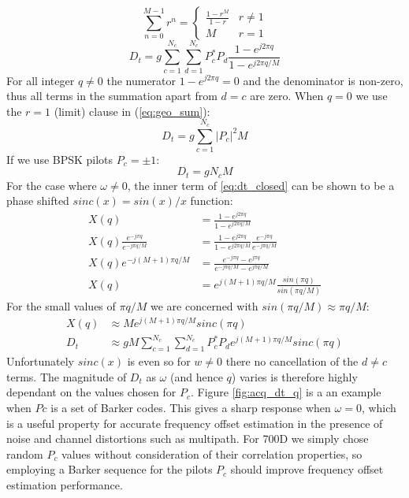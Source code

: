 \documentclass{article}
\begin{document}
\begin{equation}
\label{eq:geo_sum}
\sum_{n=0}^{M-1} r^n = 
\begin{cases}
  \frac{1-r^M}{1-r} & r \ne 1 \\
   M                & r = 1 
\end{cases}   
\end{equation}
\begin{equation}
\label{eq:dt_closed}
D_t = g \sum_{c=1}^{N_c} \sum_{d=1}^{N_c}P^*_c P_d \frac{1 - e^{j 2 \pi q }}{ 1 - e^{j 2 \pi q/M}}
\end{equation}
For all integer $q \ne 0$ the numerator $1 - e^{j 2 \pi q} = 0$ and the denominator is non-zero, thus all terms in the summation apart from $d=c$ are zero. When $q = 0$ we use the  $r=1$ (limit) clause in (\ref{eq:geo_sum}):
\begin{equation}
D_t = g \sum_{c=1}^{N_c} |P_c|^2 M
\end{equation}
If we use BPSK pilots $P_c = \pm 1$:
\begin{equation}
D_t = g N_c M
\end{equation}
For the case where $\omega \ne 0$, the inner term of \ref{eq:dt_closed} can be shown to be a phase shifted $sinc(x)=sin(x)/x$ function:
\begin{equation}
\begin{split}
X(q) &= \frac{1 - e^{j 2 \pi q }}{ 1 - e^{j 2 \pi q/M}} \\
X(q)\frac{e^{-j \pi q}}{e^{-j \pi q / M}} &= \frac{1 - e^{j 2 \pi q }}{ 1 - e^{j 2 \pi q/M}} \frac{e^{-j \pi q}}{e^{-j \pi q / M}} \\
X(q) e^{-j(M+1) \pi q / M } &= \frac{e^{-j \pi q} - e^{j \pi q}}{e^{-j \pi q/M} - e^{j \pi q/M}}  \\
X(q) &= e^{j(M+1) \pi q / M } \frac{sin(\pi q)}{sin(\pi q/M)}
\end{split}
\end{equation}
For the small values of $\pi q/M$ we are concerned with $sin(\pi q/M) \approx \pi q/M$:
\begin{equation}
\begin{split}
X(q) &\approx M e^{j(M+1) \pi q / M } sinc(\pi q) \\
D_t  &\approx gM \sum_{c=1}^{N_c} \sum_{d=1}^{N_c}P^*_c P_d e^{j(M+1) \pi q / M } sinc(\pi q)
\end{split}
\end{equation}
Unfortunately $sinc(x)$ is even so for $w \ne 0$ there no cancellation of the $d \ne c$ terms.  The magnitude of $D_t$ as $\omega$ (and hence $q$) varies is therefore highly dependant on the values chosen for $P_c$.  Figure \ref{fig:acq_dt_q} is a an example when $Pc$ is a set of Barker codes.  This gives a sharp response when $\omega=0$, which is a useful property for accurate frequency offset estimation in the presence of noise and channel distortions such as multipath. For 700D we simply chose random $P_c$ values without consideration of their correlation properties, so employing a Barker sequence for the pilots $P_c$ should improve frequency offset estimation performance.
\end{document}
